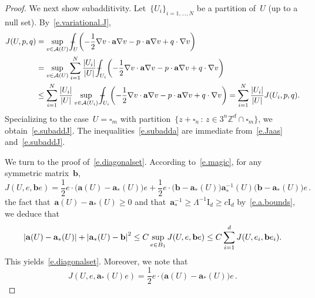 \documentclass[11pt,twoside]{article} %
\let\oldsquare\square %
\renewcommand{\square}{\oldsquare}
\numberwithin{equation}{section}
\theoremstyle{definition}
\let\originalleft\left
\let\originalright\right
\renewcommand{\left}{\mathopen{}\mathclose\bgroup\originalleft}
\renewcommand{\right}{\aftergroup\egroup\originalright}
\newcommand*{\Id}{\ensuremath{\mathrm{I}_d}}
\newcommand*{\Zd}{\ensuremath{\mathbb{Z}^d}}
\renewcommand{\b}{\ensuremath{\mathbf{b}}}
\renewcommand{\a}{\mathbf{a}}
\newcommand{\cu}{\square}
\def\Xint#1{\mathchoice
{\XXint\displaystyle\textstyle{#1}}%
{\XXint\textstyle\scriptstyle{#1}}%
{\XXint\scriptstyle\scriptscriptstyle{#1}}%
{\XXint\scriptscriptstyle\scriptscriptstyle{#1}}%
\!\int}
\def\XXint#1#2#3{{\setbox0=\hbox{$#1{#2#3}{\int}$}
\vcenter{\hbox{$#2#3$}}\kern-.5\wd0}}
\def\fint{\Xint-}
\begin{document}
\begin{proof}
\smallskip

We next show subadditivity. 
Let~$\{ U_i \}_{i=1,\ldots,N}$ be a partition of~$U$ (up to a null set). By~\eqref{e.variational.J}, 
\begin{align*}
J(U,p,q) & 
= 
\sup_{v\in \mathcal{A}(U)} 
\fint_U \left( -\frac12 \nabla v\cdot \a\nabla v -p\cdot \a\nabla v + q\cdot \nabla v   \right)
\\ & 
=
\sup_{v\in \mathcal{A}(U)} 
\sum_{i=1}^N
\frac{|U_i|}{|U|}
\fint_{U_i} \left( -\frac12 \nabla v\cdot \a\nabla v -p\cdot \a\nabla v + q\cdot \nabla v   \right)
\\ & 
\leq
\sum_{i=1}^N
\frac{|U_i|}{|U|}
\sup_{v\in \mathcal{A}(U_i)} 
\fint_{U_i} \left( -\frac12 \nabla v\cdot \a\nabla v -p\cdot \a\nabla v + q\cdot \nabla v   \right)
=
\sum_{i=1}^N
\frac{|U_i|}{|U|}
J(U_i,p,q). 
\end{align*}
Specializing to the case~$U = \cu_m$ with partition~$\{ z+\cu_n \,:\, z\in 3^n\Zd \cap \cu_m \}$, we obtain~\eqref{e.subaddJ}. The inequalities~\eqref{e.subadda} are immediate from~\eqref{e.Jaas} and~\eqref{e.subaddJ}. 

\smallskip

We turn to the proof of~\eqref{e.diagonalset}.
According to~\eqref{e.magic}, for any symmetric matrix~$\b$, 
\begin{equation}
\label{e.magic.b.plug}
J(U,e,\b e) 
=
\frac12 e \cdot \bigl( \a(U) - \a_*(U) \bigr) e
+
\frac12 e \cdot \bigl(\b - \a_*(U)\bigr) \a_*^{-1}(U) \bigl(\b - \a_*(U)\bigr) e
\,.
\end{equation}
the fact that~$\a (U)- \a_*(U) \geq 0$ and that~$\a^{-1}_* \geq \Lambda^{-1}  \Id \geq c \Id$ by~\eqref{e.a.bounds}, we deduce that 
\begin{equation*}
\left| \a(U) - \a_*(U) \right|
+ \left| \a_*(U) - \b \right|^2
\leq
C\sup_{e \in B_1} 
J(U,e,\b e) 
\leq 
C \sum_{i=1}^d 
J(U,e_i,\b e_i). 
\end{equation*}
This yields~\eqref{e.diagonalset}.
Moreover, we note that 
\begin{equation}
\label{e.JU.aastar.gap}
J(U,e,\a_*(U) e) 
=
\frac12 e \cdot \bigl( \a(U) - \a_*(U) \bigr) e
\,.
\end{equation}


\smallskip


\end{proof}
\end{document}
